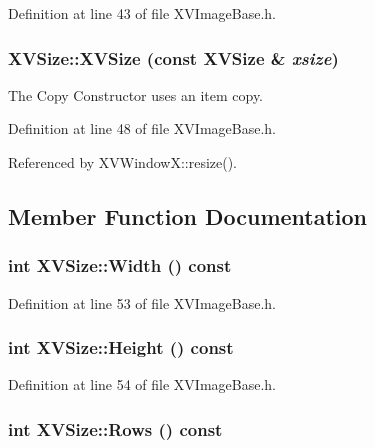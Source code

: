 Definition at line 43 of file XVImage\-Base.h.\label{XVSize_a3}
\hypertarget{class_XVSize_a3}{
\subsubsection[XVSize]{\setlength{\rightskip}{0pt plus 5cm}XVSize::XVSize (const XVSize \& {\em xsize})}}


The Copy Constructor uses an item copy.



Definition at line 48 of file XVImage\-Base.h.

Referenced by XVWindow\-X::resize().

\subsection{Member Function Documentation}
\label{XVSize_a4}
\hypertarget{class_XVSize_a4}{
\subsubsection[Width]{\setlength{\rightskip}{0pt plus 5cm}int XVSize::Width () const}}




Definition at line 53 of file XVImage\-Base.h.\label{XVSize_a5}
\hypertarget{class_XVSize_a5}{
\subsubsection[Height]{\setlength{\rightskip}{0pt plus 5cm}int XVSize::Height () const}}




Definition at line 54 of file XVImage\-Base.h.\label{XVSize_a6}
\hypertarget{class_XVSize_a6}{
\subsubsection[Rows]{\setlength{\rightskip}{0pt plus 5cm}int XVSize::Rows () const}}




